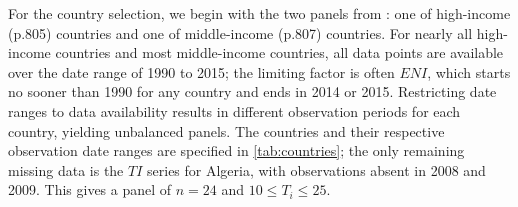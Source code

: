 \documentclass[12pt,a4paper]{article}
\begin{document}
For the country selection, we begin with the two panels from \cite{tibaIncomeTradeOpenness2018}: one of high-income (p.805) countries and one of middle-income (p.807) countries.
For nearly all high-income countries and most middle-income countries, all data points are available over the date range of 1990 to 2015; the limiting factor is often $ENI$, which starts no sooner than 1990 for any country and ends in 2014 or 2015.
Restricting date ranges to data availability results in different observation periods for each country, yielding unbalanced panels.
The countries and their respective observation date ranges are specified in \cref{tab:countries}; the only remaining missing data is the $TI$ series for Algeria, with observations absent in 2008 and 2009.
This gives a panel of $n=24$ and $10 \leq T_i \leq 25$.

\renewcommand{\arraystretch}{1}
\end{document}
